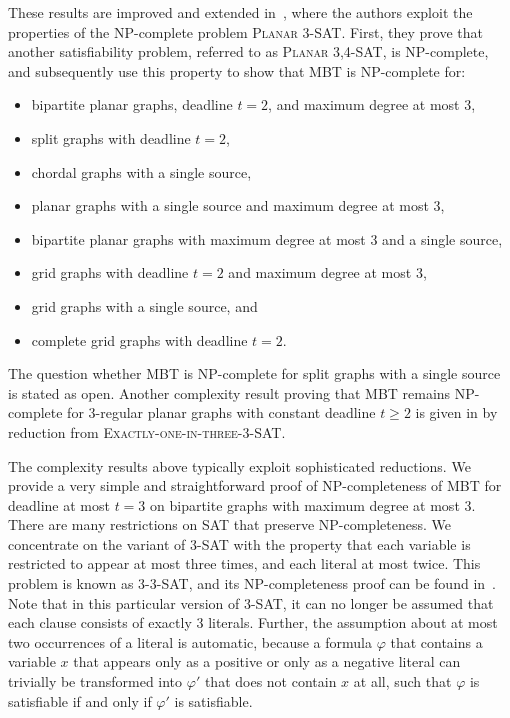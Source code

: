 These results are improved and extended in~\cite{jansen95}, where the authors exploit the properties of the NP-complete problem \textsc{Planar 3-SAT}.
First, they prove that another satisfiability problem, referred to as \textsc{Planar 3,4-SAT}, is NP-complete, and subsequently use this property to show that MBT is NP-complete for:
\begin{itemize}
\item bipartite planar graphs, deadline $t=2$, and maximum degree at most 3,
\item split graphs with deadline $t=2$,
\item chordal graphs with a single source, 
\item planar graphs with a single source and maximum degree at most 3, 
\item bipartite planar graphs with maximum degree at most 3 and a single source,
\item grid graphs with deadline $t=2$ and maximum degree at most 3,
\item grid graphs with a single source, and
\item complete grid graphs with deadline $t=2$. 
\end{itemize}
The question whether MBT is NP-complete for split graphs with a single source is stated as open.
Another complexity result proving that MBT remains NP-complete for 3-regular planar graphs with constant deadline $t\geq 2$ 
is given in \cite{middendorf93} by reduction from \textsc{Exactly-one-in-three-3-SAT}.

The complexity results above typically exploit sophisticated reductions.
We provide a very simple and straightforward proof of NP-completeness of MBT for deadline at most $t=3$ on bipartite graphs with maximum degree at most 3.
There are many restrictions on SAT that preserve NP-completeness.
We concentrate on the variant of 3-SAT with the property that each variable is restricted to appear at most three times, and each literal at most twice. 
This problem is known as \textsc{3-3-SAT}, and its NP-completeness proof can be found in~\cite{papadimitriou94}. 
Note that in this particular version of 3-SAT, it can no longer be assumed that each clause consists of exactly 3 literals.
Further, the assumption about at most two occurrences of a literal is automatic, 
because a formula $\varphi$ that contains a variable $x$ that appears only as a positive or only as a negative literal 
can trivially be transformed into $\varphi'$ that does not contain $x$ at all, 
such that $\varphi$ is satisfiable if and only if $\varphi'$ is satisfiable.

